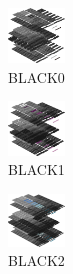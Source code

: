 \begin{minipage}[b]{0.15\linewidth}
\begin{figure}[H]                                                          
  \centering                                                             
  \begin{adjustbox}{width=1.5cm,center}                                   
  \includegraphics[width=1.5cm]{src/colorspace_colourflow/flows/colourflow_0-45.png}%
  \end{adjustbox}                                                        
\caption*{BLACK0}                                           
\end{figure}                                                               
\end{minipage}
\hspace{0.1cm}
\begin{minipage}[b]{0.15\linewidth}
\begin{figure}[H]                                                          
  \centering                                                             
  \begin{adjustbox}{width=1.5cm,center}                                   
  \includegraphics[width=1.5cm]{src/colorspace_colourflow/flows/colourflow_1-45.png}%
  \end{adjustbox}                                                        
\caption*{BLACK1}                                           
\end{figure}                                                               
\end{minipage}
\hspace{0.1cm}
\begin{minipage}[b]{0.15\linewidth}
\begin{figure}[H]                                                          
  \centering                                                             
  \begin{adjustbox}{width=1.5cm,center}                                   
  \includegraphics[width=1.5cm]{src/colorspace_colourflow/flows/colourflow_2-45.png}%
  \end{adjustbox}                                                        
\caption*{BLACK2}                                           
\end{figure}                                                               
\end{minipage}
